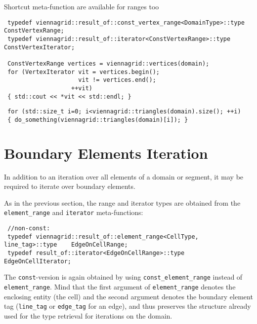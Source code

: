 Shortcut meta-function are available for ranges too
\begin{lstlisting}
 typedef viennagrid::result_of::const_vertex_range<DomainType>::type   ConstVertexRange;
 typedef viennagrid::result_of::iterator<ConstVertexRange>::type         ConstVertexIterator;

 ConstVertexRange vertices = viennagrid::vertices(domain);
 for (VertexIterator vit = vertices.begin();
                     vit != vertices.end();
                   ++vit)
 { std::cout << *vit << std::endl; }
\end{lstlisting}

\begin{lstlisting}
 for (std::size_t i=0; i<viennagrid::triangles(domain).size(); ++i)
 { do_something(viennagrid::triangles(domain)[i]); }
\end{lstlisting}

\section{Boundary Elements Iteration}
In addition to an iteration over all elements of a domain or segment, it may be required to iterate over boundary elements.


As in the previous section, the range and iterator types are obtained from the \lstinline|element_range| and \lstinline|iterator| meta-functions:
\begin{lstlisting}
 //non-const:
 typedef viennagrid::result_of::element_range<CellType, line_tag>::type    EdgeOnCellRange;
 typedef result_of::iterator<EdgeOnCellRange>::type                        EdgeOnCellIterator;
\end{lstlisting}
The \lstinline|const|-version is again obtained by using \lstinline|const_element_range| instead of \lstinline|element_range|.
Mind that the first argument of \lstinline|element_range| denotes the enclosing entity (the cell) and the second argument denotes the boundary element tag (\lstinline|line_tag| or \lstinline|edge_tag| for an edge), and thus preserves the structure already used for the type retrieval for iterations on the domain.

